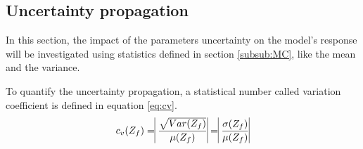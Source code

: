 \subsection{Uncertainty propagation}
In this section, the impact of the parameters uncertainty on the model's response will be investigated using statistics defined in section \ref{subsub:MC}, like the mean and the variance.



To quantify the uncertainty propagation, a statistical number called variation coefficient is defined in equation \ref{eq:cv}.
\begin{equation}
\label{eq:cv}
c_v(Z_f) = \vline\dfrac{\sqrt{Var(Z_f)}}{\mu(Z_f)}\vline= \vline\dfrac{\sigma(Z_f)}{\mu(Z_f)}\vline
\end{equation}



